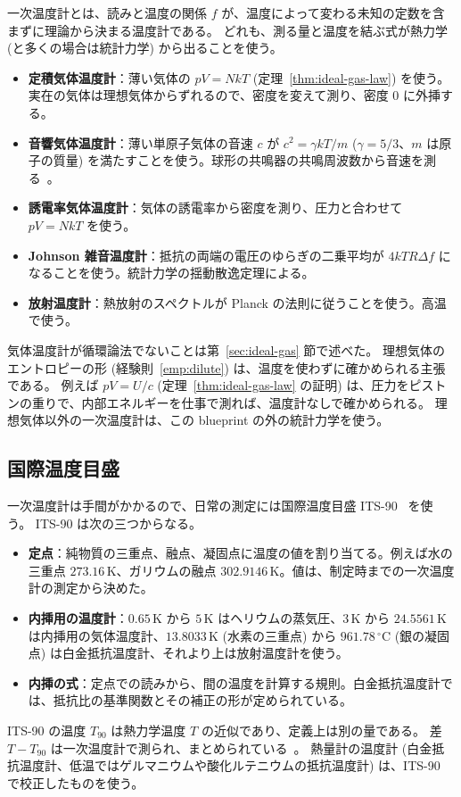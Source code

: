 一次温度計とは、読みと温度の関係 $f$ が、温度によって変わる未知の定数を含まずに理論から決まる温度計である。
どれも、測る量と温度を結ぶ式が熱力学 (と多くの場合は統計力学) から出ることを使う。

\begin{itemize}
  \item \textbf{定積気体温度計}：薄い気体の $pV = NkT$ (定理~\ref{thm:ideal-gas-law}) を使う。実在の気体は理想気体からずれるので、密度を変えて測り、密度 $0$ に外挿する。
  \item \textbf{音響気体温度計}：薄い単原子気体の音速 $c$ が $c^2 = \gamma kT/m$ ($\gamma = 5/3$、$m$ は原子の質量) を満たすことを使う。球形の共鳴器の共鳴周波数から音速を測る~\cite{Moldover1988, Moldover2014}。
  \item \textbf{誘電率気体温度計}：気体の誘電率から密度を測り、圧力と合わせて $pV = NkT$ を使う。
  \item \textbf{Johnson 雑音温度計}：抵抗の両端の電圧のゆらぎの二乗平均が $4kTR\Delta f$ になることを使う。統計力学の揺動散逸定理による。
  \item \textbf{放射温度計}：熱放射のスペクトルが Planck の法則に従うことを使う。高温で使う。
\end{itemize}

気体温度計が循環論法でないことは第~\ref{sec:ideal-gas} 節で述べた。
理想気体のエントロピーの形 (経験則~\ref{emp:dilute}) は、温度を使わずに確かめられる主張である。
例えば $pV = U/c$ (定理~\ref{thm:ideal-gas-law} の証明) は、圧力をピストンの重りで、内部エネルギーを仕事で測れば、温度計なしで確かめられる。
理想気体以外の一次温度計は、この blueprint の外の統計力学を使う。

\subsection{国際温度目盛}

一次温度計は手間がかかるので、日常の測定には国際温度目盛 ITS-90~\cite{ITS90} を使う。
ITS-90 は次の三つからなる。
\begin{itemize}
  \item \textbf{定点}：純物質の三重点、融点、凝固点に温度の値を割り当てる。例えば水の三重点 $273.16\,\mathrm{K}$、ガリウムの融点 $302.9146\,\mathrm{K}$。値は、制定時までの一次温度計の測定から決めた。
  \item \textbf{内挿用の温度計}：$0.65\,\mathrm{K}$ から $5\,\mathrm{K}$ はヘリウムの蒸気圧、$3\,\mathrm{K}$ から $24.5561\,\mathrm{K}$ は内挿用の気体温度計、$13.8033\,\mathrm{K}$ (水素の三重点) から $961.78\,^\circ\mathrm{C}$ (銀の凝固点) は白金抵抗温度計、それより上は放射温度計を使う。
  \item \textbf{内挿の式}：定点での読みから、間の温度を計算する規則。白金抵抗温度計では、抵抗比の基準関数とその補正の形が定められている。
\end{itemize}
ITS-90 の温度 $T_{90}$ は熱力学温度 $T$ の近似であり、定義上は別の量である。
差 $T - T_{90}$ は一次温度計で測られ、まとめられている~\cite{Fischer2011}。
熱量計の温度計 (白金抵抗温度計、低温ではゲルマニウムや酸化ルテニウムの抵抗温度計) は、ITS-90 で校正したものを使う。

